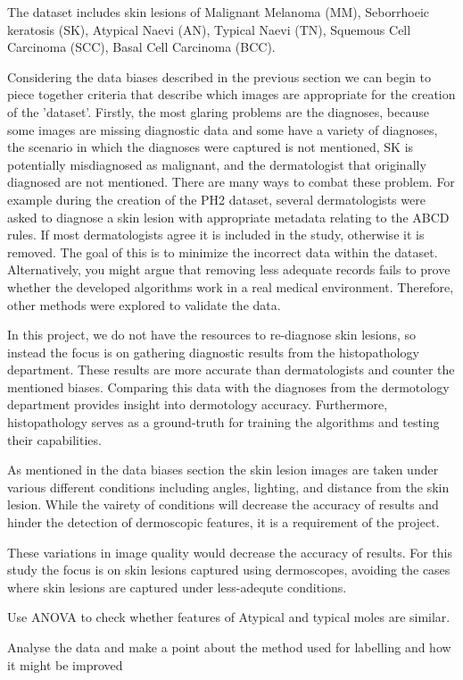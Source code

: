 The dataset includes skin lesions of Malignant Melanoma (MM), Seborrhoeic keratosis (SK), Atypical Naevi (AN), Typical Naevi (TN), Squemous Cell Carcinoma (SCC), Basal Cell Carcinoma (BCC). 


Considering the data biases described in the previous section we can begin to piece together criteria that describe which images are appropriate for the creation of the 'dataset'. Firstly, the most glaring problems are the diagnoses, because some images are missing diagnostic data and some have a variety of diagnoses, the scenario in which the diagnoses were captured is not mentioned, 
SK is potentially misdiagnosed as malignant, and the dermatologist that originally diagnosed are not mentioned. There are many ways to combat these problem. For example during the creation of the PH2 dataset\cite{mendonca2013}, several dermatologists were asked to diagnose a skin lesion with appropriate metadata relating to the ABCD rules. If most dermatologists agree it is included in the study, otherwise it is removed. The goal of this is to minimize the incorrect data within the dataset. Alternatively, you might argue that removing less adequate records fails to prove whether the developed algorithms work in a real medical environment. Therefore, other methods were explored to validate the data.

In this project, we do not have the resources to re-diagnose skin lesions, so instead the focus is on gathering diagnostic results from the histopathology department. These results are more accurate than dermatologists\cite{} and counter the mentioned biases. Comparing this data with the diagnoses from the dermotology department provides insight into dermotology accuracy. Furthermore, histopathology serves as a ground-truth for training the algorithms and testing their capabilities.

As mentioned in the data biases section the skin lesion images are taken under various different conditions including angles, lighting, and distance from the skin lesion. While the vairety of conditions will decrease the accuracy of results and hinder the detection of dermoscopic features, it is a requirement of the project. 

These variations in image quality would decrease the accuracy of results. For this study the focus is on skin lesions captured using dermoscopes, avoiding the cases where skin lesions are captured under less-adequte conditions.


Use ANOVA to check whether features of Atypical and typical moles are similar.







Analyse the data and make a point about the method used for labelling and how it might be improved
